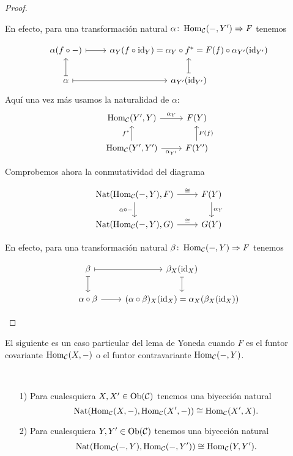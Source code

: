 \documentclass{article}
\numberwithin{equation}{section}
\theoremstyle{definition}
\begin{document}
\begin{proposicion}
\begin{proof}
\begin{enumerate}
  En efecto, para una transformación natural
  $\alpha\colon \operatorname{Hom}_\mathcal{C} (-,Y') \Rightarrow F$ tenemos

  \[ \begin{tikzcd}
      \alpha (f\circ -) \ar[|->]{r} & \alpha_Y (f\circ \id{Y}) = \alpha_Y \circ f^* = F (f) \circ \alpha_{Y'} (\id{Y'}) \\
      \alpha\ar[|->]{u}\ar[|->]{r} & \alpha_{Y'} (\id{Y'})\ar[|->]{u}
    \end{tikzcd} \]
  Aquí una vez más usamos la naturalidad de $\alpha$:
  \[ \begin{tikzcd}
      \Hom_\vcateg{C} (Y',Y)\ar{r}{\alpha_Y} & F (Y) \\
      \Hom_\vcateg{C} (Y',Y')\ar{u}{f^*}\ar{r}[swap]{\alpha_{Y'}} & F (Y') \ar{u}[swap]{F (f)}
    \end{tikzcd} \]

  Comprobemos ahora la conmutatividad del diagrama

  \[ \begin{tikzcd}
      \Nat (\Hom_\vcateg{C} (-,Y), F)\ar{d}[swap]{\alpha\circ -}\ar{r}{\isom} & F (Y)\ar{d}{\alpha_Y} \\
      \Nat (\Hom_\vcateg{C} (-,Y), G) \ar{r}{\isom} & G (Y)
    \end{tikzcd} \]

  En efecto, para una transformación natural
  $\beta\colon \operatorname{Hom}_\mathcal{C} (-,Y) \Rightarrow F$ tenemos

  \[ \begin{tikzcd}
      \beta\ar[|->]{d}\ar[|->]{r} & \beta_X (\id{X})\ar[|->]{d} \\
      \alpha\circ\beta \ar{r} & (\alpha\circ\beta)_X (\id{X}) = \alpha_X (\beta_X (\id{X}))
    \end{tikzcd} \]
\end{enumerate}
\end{proof}
\end{proposicion}

El siguiente es un caso particular del lema de Yoneda cuando $F$ es el funtor
covariante $\operatorname{Hom}_\mathcal{C} (X,-)$ o el funtor contravariante
$\operatorname{Hom}_\mathcal{C} (-,Y)$.

\begin{corolario}
  \label{encajamiento-de-yoneda}
  ~

  \begin{enumerate}
  \item[1)] Para cualesquiera $X, X' \in \operatorname{Ob}(\mathcal{C})$ tenemos una biyección
    natural
    $$\operatorname{Nat} (\operatorname{Hom}_\mathcal{C} (X,-), \operatorname{Hom}_\mathcal{C} (X',-)) \cong \operatorname{Hom}_\mathcal{C} (X',X).$$

  \item[2)] Para cualesquiera $Y, Y' \in \operatorname{Ob}(\mathcal{C})$ tenemos una biyección
    natural
    $$\operatorname{Nat} (\operatorname{Hom}_\mathcal{C} (-,Y), \operatorname{Hom}_\mathcal{C} (-,Y')) \cong \operatorname{Hom}_\mathcal{C} (Y,Y').$$
  \end{enumerate}
\end{corolario}
\end{document}
